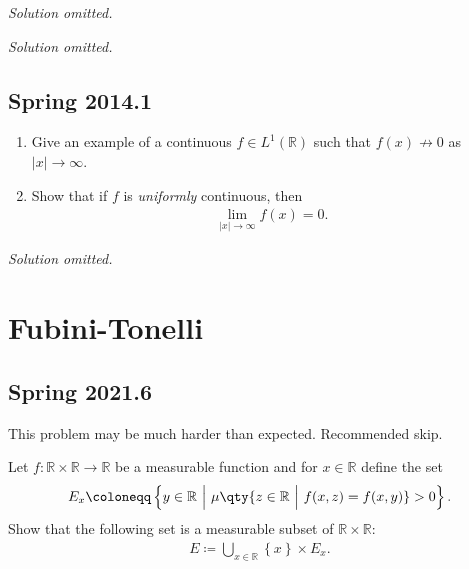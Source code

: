 \emph{Solution omitted.}

\emph{Solution omitted.}

\hypertarget{spring-2014.1}{%
\subsection{Spring 2014.1}\label{spring-2014.1}}

\begin{problem}[?]

\begin{enumerate}
\def\labelenumi{\arabic{enumi}.}
\item
  Give an example of a continuous \(f\in L^1({\mathbb{R}})\) such that
  \(f(x) \not\to 0\) as\({\left\lvert {x} \right\rvert} \to \infty\).
\item
  Show that if \(f\) is \emph{uniformly} continuous, then
  \begin{align*}
  \lim_{{\left\lvert {x} \right\rvert} \to \infty} f(x) = 0.
  \end{align*}
\end{enumerate}

\end{problem}

\emph{Solution omitted.}

\hypertarget{fubini-tonelli}{%
\section{Fubini-Tonelli}\label{fubini-tonelli}}

\hypertarget{spring-2021.6}{%
\subsection{Spring 2021.6}\label{spring-2021.6}}

\begin{warnings}

This problem may be much harder than expected. Recommended skip.

\end{warnings}

Let \(f: {\mathbb{R}}\times{\mathbb{R}}\to {\mathbb{R}}\) be a
measurable function and for \(x\in {\mathbb{R}}\) define the set
\begin{align*}
E_x \coloneqq\left\{{ y\in {\mathbb{R}}{~\mathrel{\Big\vert}~}\mu\qty{ z\in {\mathbb{R}}{~\mathrel{\Big\vert}~}f(x,z) = f(x, y) } > 0 }\right\} 
.\end{align*}
Show that the following set is a measurable subset of
\({\mathbb{R}}\times{\mathbb{R}}\):
\begin{align*}
E \coloneqq\displaystyle\bigcup_{x\in {\mathbb{R}}} \left\{{ x }\right\} \times E_x
.\end{align*}

